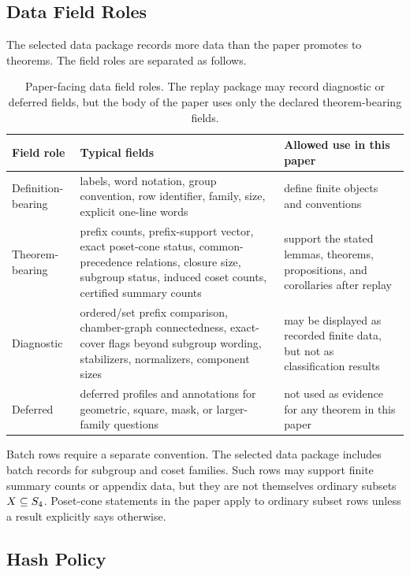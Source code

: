 \subsection{Data Field Roles}
\label{app:atlas-field-roles}

The selected data package records more data than the paper promotes to theorems. The field roles are separated as follows.

\begin{table}[htbp]
\centering
\small
\begin{tabular}{@{}p{}p{}p{}@{}}
\toprule
Field role & Typical fields & Allowed use in this paper \\
\midrule
Definition-bearing & labels, word notation, group convention, row identifier, family, size, explicit one-line words & define finite objects and conventions \\
Theorem-bearing & prefix counts, prefix-support vector, exact poset-cone status, common-precedence relations, closure size, subgroup status, induced coset counts, certified summary counts & support the stated lemmas, theorems, propositions, and corollaries after replay \\
Diagnostic & ordered/set prefix comparison, chamber-graph connectedness, exact-cover flags beyond subgroup wording, stabilizers, normalizers, component sizes & may be displayed as recorded finite data, but not as classification results \\
Deferred & deferred profiles and annotations for geometric, square, mask, or larger-family questions & not used as evidence for any theorem in this paper \\
\bottomrule
\end{tabular}
\caption{Paper-facing data field roles. The replay package may record diagnostic or deferred fields, but the body of the paper uses only the declared theorem-bearing fields.}
\label{tab:atlas-schema-roles-appendix}
\end{table}

Batch rows require a separate convention. The selected data package includes batch records for subgroup and coset families. Such rows may support finite summary counts or appendix data, but they are not themselves ordinary subsets \(X\subseteq S_4\). Poset-cone statements in the paper apply to ordinary subset rows unless a result explicitly says otherwise.

\subsection{Hash Policy}
\label{app:hash-policy}

